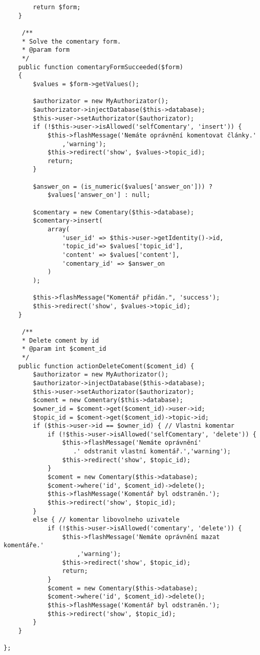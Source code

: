 \documentclass[thesis=B,czech]{FITthesis}[2012/06/26]
\begin{document}
\begin{tiny}
\begin{verbatim}
        return $form;
    }

     /**
     * Solve the comentary form.
     * @param form
     */    
    public function comentaryFormSucceeded($form)
    {                
        $values = $form->getValues();
        
        $authorizator = new MyAuthorizator();
        $authorizator->injectDatabase($this->database);
        $this->user->setAuthorizator($authorizator);
        if (!$this->user->isAllowed('selfComentary', 'insert')) {
            $this->flashMessage('Nemáte oprávnění komentovat články.'
                ,'warning');
            $this->redirect('show', $values->topic_id);
            return;
        }
        
        $answer_on = (is_numeric($values['answer_on'])) ?
            $values['answer_on'] : null; 
        
        $comentary = new Comentary($this->database);
        $comentary->insert(
            array(
                'user_id' => $this->user->getIdentity()->id,
                'topic_id'=> $values['topic_id'],
                'content' => $values['content'],
                'comentary_id' => $answer_on
            )
        );
    
        $this->flashMessage("Komentář přidán.", 'success');
        $this->redirect('show', $values->topic_id);
    }
    
     /**
     * Delete coment by id
     * @param int $coment_id
     */    
    public function actionDeleteComent($coment_id) {
        $authorizator = new MyAuthorizator();
        $authorizator->injectDatabase($this->database);
        $this->user->setAuthorizator($authorizator);
        $coment = new Comentary($this->database);
        $owner_id = $coment->get($coment_id)->user->id;
        $topic_id = $coment->get($coment_id)->topic->id;
        if ($this->user->id == $owner_id) { // Vlastni komentar
            if (!$this->user->isAllowed('selfComentary', 'delete')) {
                $this->flashMessage('Nemáte oprávnění' 
                   .' odstranit vlastní komentář.','warning');
                $this->redirect('show', $topic_id);
            } 
            $coment = new Comentary($this->database);
            $coment->where('id', $coment_id)->delete(); 
            $this->flashMessage('Komentář byl odstraněn.');
            $this->redirect('show', $topic_id);     
        }
        else { // komentar libovolneho uzivatele
            if (!$this->user->isAllowed('comentary', 'delete')) {
                $this->flashMessage('Nemáte oprávnění mazat komentáře.'
                    ,'warning');
                $this->redirect('show', $topic_id);
                return;
            }
            $coment = new Comentary($this->database);
            $coment->where('id', $coment_id)->delete();
            $this->flashMessage('Komentář byl odstraněn.');
            $this->redirect('show', $topic_id);
        }
    }

};    

\end{verbatim}
\end{tiny}
\pagebreak
\end{document}
